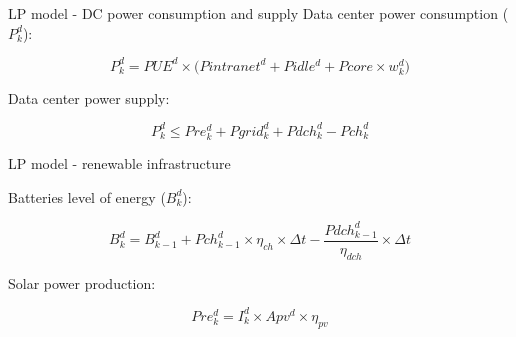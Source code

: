 \documentclass[Ligatures=TeX,table,svgnames,usetotalslideindicator,compress,10pt,aspectratio=169]{beamer}
\begin{document}
\begin{frame}{LP model - DC power consumption and supply} 
  \alert{ Data center power consumption ($P^d_k $):}
  
  \begin{equation}    
    P^d_k  = PUE^d \times \big( Pintranet^d + Pidle^d  + Pcore \times w^d_k\big)
  \end{equation}



  \alert{ Data center power supply:}
  
  \begin{equation}
    P^d_k \leq Pre^d_k + Pgrid^d_k + Pdch_k^d - Pch_k^d   
  \end{equation}



\end{frame}

\begin{frame}{LP model - renewable infrastructure}

  \alert{Batteries level of energy ($B^d_ k$):} 

  \begin{equation} \label{eq:bdk}
    B^d_k = B^d_{k-1}  + Pch^d_{k-1} \times \eta_{ch} \times \Delta{t} - \frac{Pdch^d_{k-1}}{\eta_{dch}} \times \Delta{t}
  \end{equation}


  \alert{Solar power production:}

  \begin{equation} \label{eq:predk}
    Pre^d_{k}= I^d_k \times Apv^d \times \eta_{pv}
  \end{equation}


\end{frame}
\end{document}
